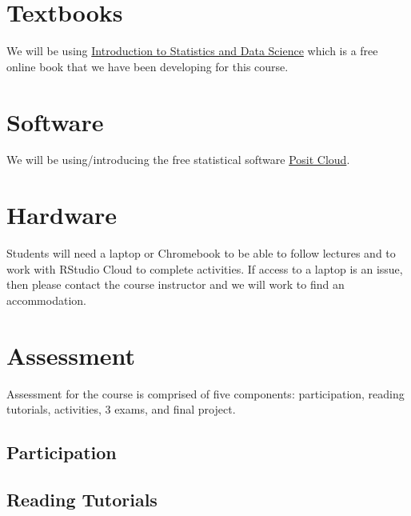 \documentclass[
  letterpaper,
  DIV=11,
  numbers=noendperiod]{scrreprt}
\begin{document}
\hypertarget{textbooks}{%
\section*{Textbooks}\label{textbooks}}

We will be using
\href{https://nustat.github.io/intro-stat-data-sci/}{Introduction to
Statistics and Data Science} which is a free online book that we have
been developing for this course.

\hypertarget{software}{%
\section*{Software}\label{software}}

We will be using/introducing the free statistical software
\href{https://posit.cloud/}{Posit Cloud}.

\hypertarget{hardware}{%
\section*{Hardware}\label{hardware}}

Students will need a laptop or Chromebook to be able to follow lectures
and to work with RStudio Cloud to complete activities. If access to a
laptop is an issue, then please contact the course instructor and we
will work to find an accommodation.

\hypertarget{assessment}{%
\section*{Assessment}\label{assessment}}

Assessment for the course is comprised of five components:
participation, reading tutorials, activities, 3 exams, and final
project.

\hypertarget{participation}{%
\subsection*{Participation}\label{participation}}

\hypertarget{reading-tutorials}{%
\subsection*{Reading Tutorials}\label{reading-tutorials}}
\end{document}
